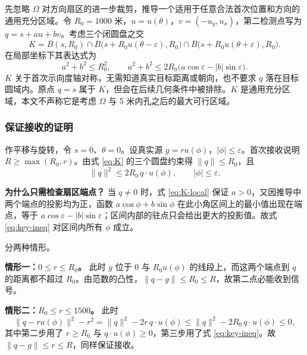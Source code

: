 先忽略 $\Omega$ 对方向扇区的进一步裁剪，推导一个适用于任意合法首次位置和方向的通用充分区域。令 $R_0=1000$ 米，$u=u(\theta)$，$v=(-u_y,u_x)$，第二检测点写为 $q=s+au+bv$。考虑三个闭圆盘之交
\begin{equation}
  K=\overline{B}(s,R_0)
  \cap\overline{B}\bigl(s+R_0u(\theta-\varepsilon),R_0\bigr)
  \cap\overline{B}\bigl(s+R_0u(\theta+\varepsilon),R_0\bigr).
  \label{eq:K}
\end{equation}
在局部坐标下其表达式为
\begin{equation}
  \boxed{\ a^2+b^2\le R_0^2,\qquad a^2+b^2\le 2R_0\bigl(a\cos\varepsilon-\lvert b\rvert\sin\varepsilon\bigr).\ }
  \label{eq:K-local}
\end{equation}
$K$ 关于首次示向度轴对称，无需知道真实目标距离或朝向，也不要求 $q$ 落在目标圆域内。原点 $q=s$ 属于 $K$，但会在后续几何条件中被排除。$K$ 是通用充分区域，本文不声称它是考虑 $\Omega$ 与 5 米内孔之后的最大可行区域。

\subsubsection{保证接收的证明}

作平移与旋转，令 $s=0$、$\theta=0$。设真实源 $g=ru(\phi)$，$\lvert\phi\rvert\le\varepsilon$。首次接收说明 $R\ge\max(R_0,r)$。由式 \eqref{eq:K} 的三个圆盘约束得 $\lVert q\rVert\le R_0$，且
\begin{equation}
  \lVert q\rVert^2\le2R_0\,q\cdot u(\phi),\qquad \lvert\phi\rvert\le\varepsilon .
  \label{eq:key-ineq}
\end{equation}

\textbf{为什么只需检查扇区端点？} 当 $q\ne0$ 时，式 \eqref{eq:K-local} 保证 $a>0$，又因推导中两个端点的投影均为正，函数 $a\cos\phi+b\sin\phi$ 在此小角区间上的最小值出现在端点，等于 $a\cos\varepsilon-\lvert b\rvert\sin\varepsilon$；区间内部的驻点只会给出更大的投影值。故式 \eqref{eq:key-ineq} 对区间内所有 $\phi$ 成立。

分两种情形。

\textbf{情形一：$0\le r\le R_0$。} 此时 $g$ 位于 $0$ 与 $R_0u(\phi)$ 的线段上，而这两个端点到 $q$ 的距离都不超过 $R_0$。由范数的凸性，$\lVert q-g\rVert\le R_0\le R$，故第二点必能收到信号。

\textbf{情形二：$R_0\le r\le1500$。} 此时
\begin{equation}
  \lVert q-ru(\phi)\rVert^2-r^2
  =\lVert q\rVert^2-2r\,q\cdot u(\phi)
  \le\lVert q\rVert^2-2R_0\,q\cdot u(\phi)\le0 ,
\end{equation}
其中第二步用了 $r\ge R_0$ 与 $q\cdot u(\phi)\ge0$，第三步用了式 \eqref{eq:key-ineq}。故 $\lVert q-g\rVert\le r\le R$，同样保证接收。

